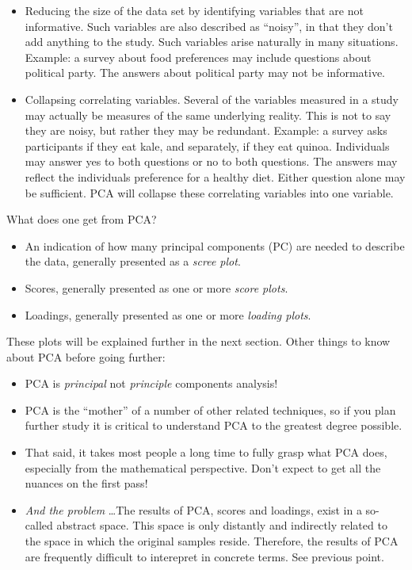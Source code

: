 \documentclass[10pt,twocolumn,twoside,]{pinp}
\providecommand{\tightlist}{%
  \setlength{\itemsep}{0pt}\setlength{\parskip}{0pt}}
\begin{document}
\begin{itemize}
\tightlist
\item
  Reducing the size of the data set by identifying variables that are
  not informative. Such variables are also described as ``noisy'', in
  that they don't add anything to the study. Such variables arise
  naturally in many situations. Example: a survey about food preferences
  may include questions about political party. The answers about
  political party may not be informative.
\item
  Collapsing correlating variables. Several of the variables measured in
  a study may actually be measures of the same underlying reality. This
  is not to say they are noisy, but rather they may be redundant.
  Example: a survey asks participants if they eat kale, and separately,
  if they eat quinoa. Individuals may answer yes to both questions or no
  to both questions. The answers may reflect the individuals preference
  for a healthy diet. Either question alone may be sufficient. PCA will
  collapse these correlating variables into one variable.
\end{itemize}

What does one get from PCA?

\begin{itemize}
\tightlist
\item
  An indication of how many principal components (PC) are needed to
  describe the data, generally presented as a \emph{scree plot}.
\item
  Scores, generally presented as one or more \emph{score plots}.
\item
  Loadings, generally presented as one or more \emph{loading plots}.
\end{itemize}

These plots will be explained further in the next section. Other things
to know about PCA before going further:

\begin{itemize}
\tightlist
\item
  PCA is \emph{principal} not \emph{principle} components analysis!
\item
  PCA is the ``mother'' of a number of other related techniques, so if
  you plan further study it is critical to understand PCA to the
  greatest degree possible.
\item
  That said, it takes most people a long time to fully grasp what PCA
  does, especially from the mathematical perspective. Don't expect to
  get all the nuances on the first pass!
\item
  \emph{And the problem} \ldots The results of PCA, scores and loadings,
  exist in a so-called abstract space. This space is only distantly and
  indirectly related to the space in which the original samples reside.
  Therefore, the results of PCA are frequently difficult to interepret
  in concrete terms. See previous point.
\end{itemize}
\end{document}
